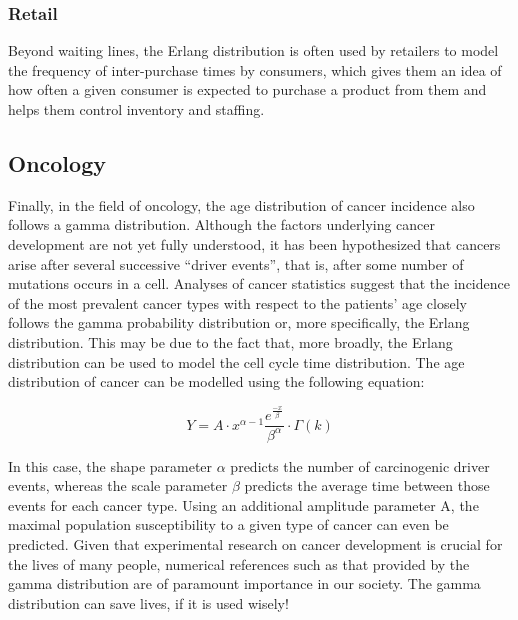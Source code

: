 \documentclass[12pt]{article}
\begin{document}
\subsubsection{Retail}
Beyond waiting lines, the Erlang distribution is often used by retailers to model the frequency of inter-purchase times
by consumers, which gives them an idea of how often a given consumer is expected to purchase a product from them and
helps them control inventory and staffing.


\pagebreak
\subsection{Oncology}
Finally, in the field of oncology, the age distribution of cancer incidence also follows a gamma distribution. Although
the factors underlying cancer development are not yet fully understood, it has been hypothesized that cancers arise
after several successive “driver events”, that is, after some number of mutations occurs in a cell. Analyses of cancer
statistics suggest that the incidence of the most prevalent cancer types with respect to the patients' age closely
follows the gamma probability distribution or, more specifically, the Erlang distribution. This may be due to the fact
that, more broadly, the Erlang distribution can be used to model the cell cycle time
distribution\cite{belikovNumberKeyCarcinogenic2017}. The age distribution of cancer can be modelled using the following equation:

\begin{equation}
	Y = A\cdot x^{\alpha-1}\frac{e^{\frac{-x}{\beta}}}{\beta^\alpha}\cdot\Gamma(k)
\end{equation}

In this case, the shape parameter $\alpha$ predicts the number of carcinogenic driver events, whereas the scale
parameter $\beta$ predicts the average time between those events for each cancer type. Using an additional amplitude
parameter A, the maximal population susceptibility to a given type of cancer can even be
predicted\cite{belikovNumberKeyCarcinogenic2017}. Given that experimental research on cancer development is crucial for
the lives of many people, numerical references such as that provided by the gamma distribution are of paramount
importance in our society. The gamma distribution can save lives, if it is used wisely!
\end{document}
